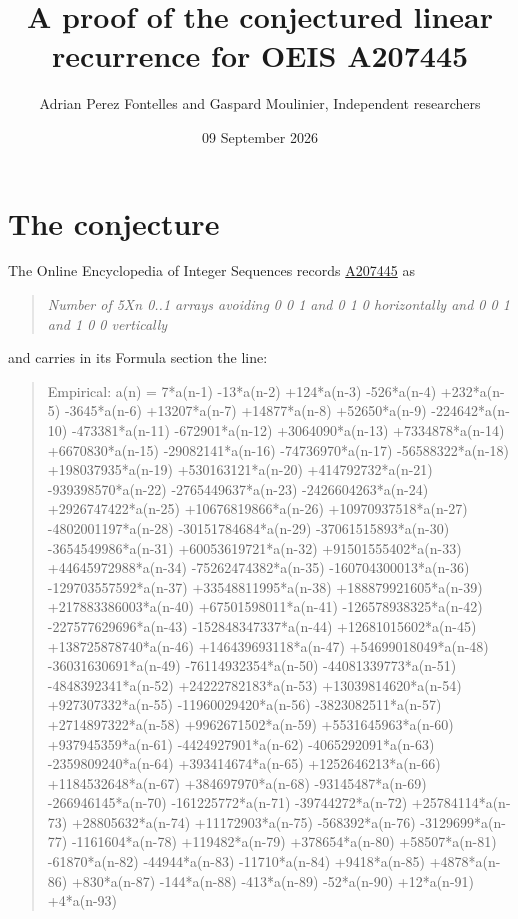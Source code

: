 \documentclass[11pt]{article}
\title{A proof of the conjectured linear recurrence for OEIS A207445}
\author{Adrian Perez Fontelles and Gaspard Moulinier, Independent researchers}
\date{09 September 2026}
\theoremstyle{definition}
\begin{document}
\maketitle
\section{The conjecture}

The Online Encyclopedia of Integer Sequences records \href{https://oeis.org/A207445}{A207445} as

\begin{quote}\itshape Number of 5Xn 0..1 arrays avoiding 0 0 1 and 0 1 0 horizontally and 0 0 1 and 1 0 0 vertically\end{quote}

and carries in its Formula section the line:

\begin{quote}\ttfamily Empirical: a(n) = 7*a(n-1) -13*a(n-2) +124*a(n-3) -526*a(n-4) +232*a(n-5) -3645*a(n-6) +13207*a(n-7) +14877*a(n-8) +52650*a(n-9) -224642*a(n-10) -473381*a(n-11) -672901*a(n-12) +3064090*a(n-13) +7334878*a(n-14) +6670830*a(n-15) -29082141*a(n-16) -74736970*a(n-17) -56588322*a(n-18) +198037935*a(n-19) +530163121*a(n-20) +414792732*a(n-21) -939398570*a(n-22) -2765449637*a(n-23) -2426604263*a(n-24) +2926747422*a(n-25) +10676819866*a(n-26) +10970937518*a(n-27) -4802001197*a(n-28) -30151784684*a(n-29) -37061515893*a(n-30) -3654549986*a(n-31) +60053619721*a(n-32) +91501555402*a(n-33) +44645972988*a(n-34) -75262474382*a(n-35) -160704300013*a(n-36) -129703557592*a(n-37) +33548811995*a(n-38) +188879921605*a(n-39) +217883386003*a(n-40) +67501598011*a(n-41) -126578938325*a(n-42) -227577629696*a(n-43) -152848347337*a(n-44) +12681015602*a(n-45) +138725878740*a(n-46) +146439693118*a(n-47) +54699018049*a(n-48) -36031630691*a(n-49) -76114932354*a(n-50) -44081339773*a(n-51) -4848392341*a(n-52) +24222782183*a(n-53) +13039814620*a(n-54) +927307332*a(n-55) -11960029420*a(n-56) -3823082511*a(n-57) +2714897322*a(n-58) +9962671502*a(n-59) +5531645963*a(n-60) +937945359*a(n-61) -4424927901*a(n-62) -4065292091*a(n-63) -2359809240*a(n-64) +393414674*a(n-65) +1252646213*a(n-66) +1184532648*a(n-67) +384697970*a(n-68) -93145487*a(n-69) -266946145*a(n-70) -161225772*a(n-71) -39744272*a(n-72) +25784114*a(n-73) +28805632*a(n-74) +11172903*a(n-75) -568392*a(n-76) -3129699*a(n-77) -1161604*a(n-78) +119482*a(n-79) +378654*a(n-80) +58507*a(n-81) -61870*a(n-82) -44944*a(n-83) -11710*a(n-84) +9418*a(n-85) +4878*a(n-86) +830*a(n-87) -144*a(n-88) -413*a(n-89) -52*a(n-90) +12*a(n-91) +4*a(n-93)\end{quote}
\end{document}
